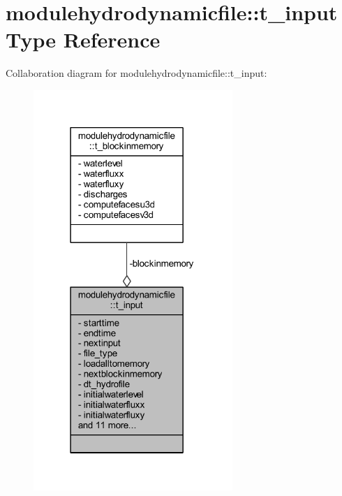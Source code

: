 \hypertarget{structmodulehydrodynamicfile_1_1t__input}{}\section{modulehydrodynamicfile\+:\+:t\+\_\+input Type Reference}
\label{structmodulehydrodynamicfile_1_1t__input}


Collaboration diagram for modulehydrodynamicfile\+:\+:t\+\_\+input\+:\nopagebreak
\begin{figure}[H]
\begin{center}
\leavevmode
\includegraphics[width=214pt]{structmodulehydrodynamicfile_1_1t__input__coll__graph}
\end{center}
\end{figure}
